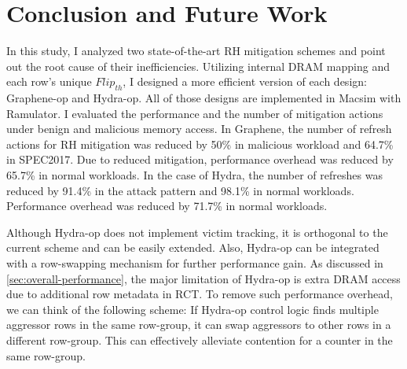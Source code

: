\chapter{Conclusion and Future Work} \label{sec:Conclusion}
In this study, I analyzed two state-of-the-art RH mitigation schemes and point out the root cause of their inefficiencies. 
Utilizing internal DRAM mapping and each row's unique $Flip_{th}$, I designed a more efficient version of each design:
Graphene-op and Hydra-op. All of those designs are implemented in Macsim with Ramulator. I evaluated the performance
and the number of mitigation actions under benign and malicious memory access. In Graphene, the number of refresh actions 
for RH mitigation was reduced by 50\% in malicious workload and 64.7\% in SPEC2017. 
Due to reduced mitigation, performance overhead was reduced by 65.7\% in normal workloads. 
In the case of Hydra, the number of refreshes was reduced by 91.4\% in the attack pattern and 98.1\% in normal workloads. 
Performance overhead was reduced by 71.7\% in normal workloads. 

Although Hydra-op does not implement victim tracking, it is orthogonal to the current scheme and can be easily extended.
 Also, Hydra-op can be integrated with a row-swapping mechanism for further performance gain. As discussed in \ref{sec:overall-performance},
 the major limitation of Hydra-op is extra DRAM access due to additional row metadata in RCT. To remove such performance overhead, 
 we can think of the following scheme: If Hydra-op control logic finds multiple aggressor rows in the same row-group, 
 it can swap aggressors to other rows in a different row-group. This can effectively alleviate contention for a counter in the same row-group.

